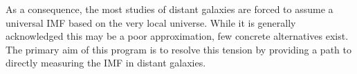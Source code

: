 \documentclass[11pt,preprint]{aastex}
\begin{document}
As a consequence, the most studies of distant galaxies are forced to assume a universal IMF based on the very local universe.  While it is generally acknowledged this may be a poor approximation, few concrete alternatives exist.  The primary aim of this program is to resolve this tension by providing a path to directly measuring the IMF in distant galaxies.








%
\end{document}
